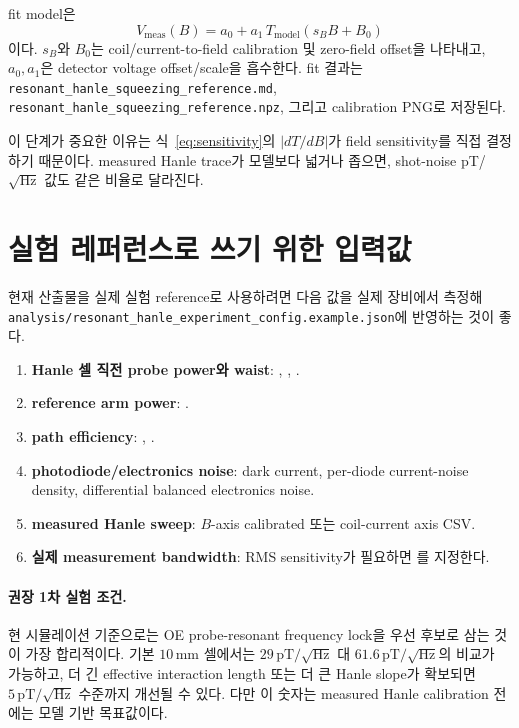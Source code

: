\documentclass[11pt,a4paper]{article}
\newcommand{\pT}{\,\mathrm{pT}}
\newcommand{\sqrtHz}{/\sqrt{\mathrm{Hz}}}
\begin{document}
fit model은
\begin{equation}
V_{\mathrm{meas}}(B)
= a_0 + a_1\,T_{\mathrm{model}}\!\left(s_B B + B_0\right)
\end{equation}
이다. \(s_B\)와 \(B_0\)는 coil/current-to-field calibration 및 zero-field offset을 나타내고,
\(a_0,a_1\)은 detector voltage offset/scale을 흡수한다. fit 결과는
\texttt{resonant\_hanle\_squeezing\_reference.md},
\texttt{resonant\_hanle\_squeezing\_reference.npz}, 그리고 calibration PNG로 저장된다.

이 단계가 중요한 이유는 식~\eqref{eq:sensitivity}의 \(|dT/dB|\)가 field sensitivity를 직접 결정하기 때문이다.
measured Hanle trace가 모델보다 넓거나 좁으면, shot-noise pT/\(\sqrt{\mathrm{Hz}}\) 값도 같은 비율로 달라진다.

\section{실험 레퍼런스로 쓰기 위한 입력값}

현재 산출물을 실제 실험 reference로 사용하려면 다음 값을 실제 장비에서 측정해
\texttt{analysis/resonant\_hanle\_experiment\_config.example.json}에 반영하는 것이 좋다.

\begin{enumerate}[nosep]
\item \textbf{Hanle 셀 직전 probe power와 waist}: ,
      , .
\item \textbf{reference arm power}: .
\item \textbf{path efficiency}: , .
\item \textbf{photodiode/electronics noise}: dark current, per-diode current-noise density,
      differential balanced electronics noise.
\item \textbf{measured Hanle sweep}: \(B\)-axis calibrated 또는 coil-current axis CSV.
\item \textbf{실제 measurement bandwidth}: RMS sensitivity가 필요하면
      를 지정한다.
\end{enumerate}

\paragraph{권장 1차 실험 조건.}
현 시뮬레이션 기준으로는 OE probe-resonant frequency lock을 우선 후보로 삼는 것이 가장 합리적이다.
기본 \(10\,\mathrm{mm}\) 셀에서는 \(29\pT\sqrtHz\) 대 \(61.6\pT\sqrtHz\)의 비교가 가능하고,
더 긴 effective interaction length 또는 더 큰 Hanle slope가 확보되면 \(5\pT\sqrtHz\) 수준까지
개선될 수 있다. 다만 이 숫자는 measured Hanle calibration 전에는 모델 기반 목표값이다.
\end{document}
